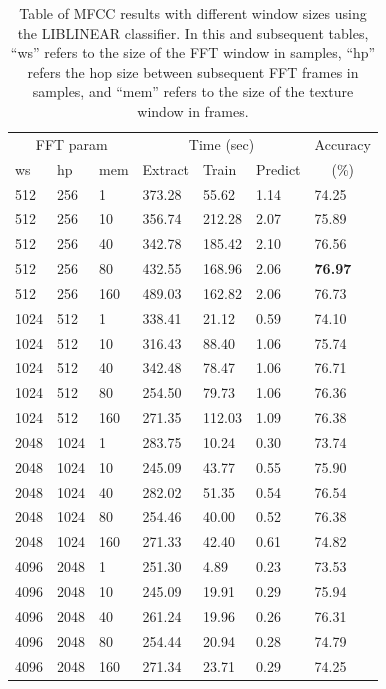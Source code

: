 \begin{table}
\begin{tabular}{|l|l|l|l|l|l|l|}
\hline
\multicolumn{3}{|c|}{FFT param} & \multicolumn{3}{c|}{Time (sec)} & Accuracy \\
\hhline{|-|-|-|-|-|-|~|}
ws & hp & mem & Extract & Train & Predict & \multicolumn{1}{c|}{(\%)} \\
\hhline{|=|=|=|=|=|=|=|}
512   &  256   &  1    &    373.28  &   55.62  &  1.14  &  74.25  \\
512   &  256   &  10   &    356.74  &  212.28  &  2.07  &  75.89  \\
512   &  256   &  40   &    342.78  &  185.42  &  2.10  &  76.56  \\
512   &  256   &  80   &    432.55  &  168.96  &  2.06  &  \textbf{76.97}  \\
512   &  256   &  160  &    489.03  &  162.82  &  2.06  &  76.73  \\
\hline
1024  &  512   &  1    &    338.41  &   21.12  &  0.59  &  74.10  \\
1024  &  512   &  10   &    316.43  &   88.40  &  1.06  &  75.74  \\
1024  &  512   &  40   &    342.48  &   78.47  &  1.06  &  76.71  \\
1024  &  512   &  80   &    254.50  &   79.73  &  1.06  &  76.36  \\
1024  &  512   &  160  &    271.35  &  112.03  &  1.09  &  76.38  \\
\hline
2048  &  1024  &  1    &    283.75  &   10.24  &  0.30  &  73.74  \\
2048  &  1024  &  10   &    245.09  &   43.77  &  0.55  &  75.90  \\
2048  &  1024  &  40   &    282.02  &   51.35  &  0.54  &  76.54  \\
2048  &  1024  &  80   &    254.46  &   40.00  &  0.52  &  76.38  \\
2048  &  1024  &  160  &    271.33  &   42.40  &  0.61  &  74.82  \\
\hline
4096  &  2048  &  1    &    251.30  &    4.89  &  0.23  &  73.53  \\
4096  &  2048  &  10   &    245.09  &   19.91  &  0.29  &  75.94  \\
4096  &  2048  &  40   &    261.24  &   19.96  &  0.26  &  76.31  \\
4096  &  2048  &  80   &    254.44  &   20.94  &  0.28  &  74.79  \\
4096  &  2048  &  160  &    271.34  &   23.71  &  0.29  &  74.25  \\
\hline
\end{tabular}
\caption{Table of MFCC results with different window sizes using the
  LIBLINEAR classifier.  In this and subsequent tables, ``ws'' refers
  to the size of the FFT window in samples, ``hp'' refers the hop size
  between subsequent FFT frames in samples, and ``mem'' refers to the
  size of the texture window in frames.}
\label{table:obv-fft}
\end{table}


